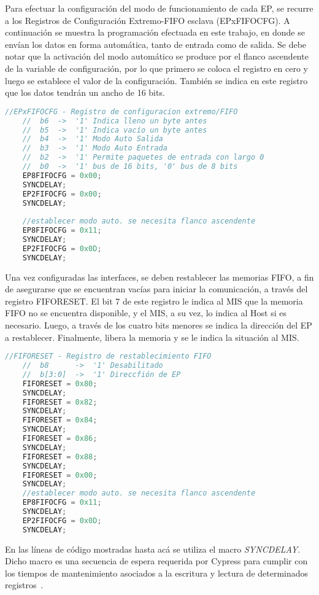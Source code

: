 	Para efectuar la configuración del modo de funcionamiento de cada EP, se recurre a los Registros de Configuración Extremo-FIFO esclava (EPxFIFOCFG). A continuación se muestra la programación efectuada en este trabajo, en donde se envían los datos en forma automática, tanto de entrada como de salida. Se debe notar que la activación del modo automático se produce por el flanco ascendente de la variable de configuración, por lo que primero se coloca el registro en cero y luego se establece el valor de la configuración. También se indica en este registro que los datos tendrán un ancho de 16 bits.
	
	\begin{lstlisting}[language=C,backgroundcolor=\color{gray!30}]
	//EPxFIFOCFG - Registro de configuracion extremo/FIFO
	//	b6	->	'1' Indica lleno un byte antes
	//	b5	->	'1' Indica vacío un byte antes
	//	b4	->	'1' Modo Auto Salida
	//	b3	->	'1' Modo Auto Entrada
	//	b2	->	'1' Permite paquetes de entrada con largo 0
	//	b0	->	'1' bus de 16 bits, '0' bus de 8 bits
	EP8FIFOCFG = 0x00;
	SYNCDELAY;
	EP2FIFOCFG = 0x00;
	SYNCDELAY;
	
	//establecer modo auto. se necesita flanco ascendente
	EP8FIFOCFG = 0x11;
	SYNCDELAY;
	EP2FIFOCFG = 0x0D;
	SYNCDELAY;
	\end{lstlisting}
	
	Una vez configuradas las interfaces, se deben restablecer las memorias FIFO, a fin de asegurarse que se encuentran vacías para iniciar la comunicación, a través del registro FIFORESET. El bit 7 de este registro le indica al MIS que la memoria FIFO no se encuentra disponible, y el MIS, a su vez, lo indica al Host si es necesario. Luego, a través de los cuatro bits menores se indica la dirección del EP a restablecer. Finalmente, libera la memoria y se le indica la situación al MIS.
	
	\begin{lstlisting}[language=C,backgroundcolor=\color{gray!30}]
	//FIFORESET - Registro de restablecimiento FIFO
	//	b8		->	'1' Desabilitado
	//	b[3:0]	->	'1' Direccfión de EP
	FIFORESET = 0x80;
	SYNCDELAY;
	FIFORESET = 0x82;
	SYNCDELAY;
	FIFORESET = 0x84;
	SYNCDELAY;
	FIFORESET = 0x86;
	SYNCDELAY;
	FIFORESET = 0x88;
	SYNCDELAY;
	FIFORESET = 0x00;
	SYNCDELAY;
	//establecer modo auto. se necesita flanco ascendente
	EP8FIFOCFG = 0x11;
	SYNCDELAY;
	EP2FIFOCFG = 0x0D;
	SYNCDELAY;
	\end{lstlisting}
	

	En las líneas de código mostradas hasta acá se utiliza el macro {\it SYNCDELAY}. Dicho macro es una secuencia de espera requerida por Cypress para cumplir con los tiempos de mantenimiento asociados a la escritura y lectura de determinados registros~\cite{CypressSemiconductor2014fx2lp}.%
